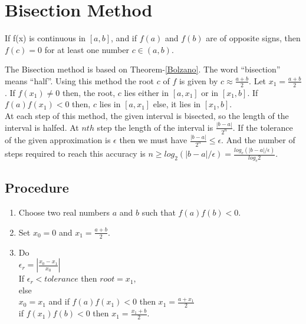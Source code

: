 \documentclass[aima203_lecturenotes_ku.tex]{subfiles}
\begin{document}
\section{Bisection Method}
\begin{mdframed}[style=myframe]
  \begin{theorem}
    \label{Bolzano}
  If f(x) is continuous in \([a,b]\), and if \(f(a)\) and \(f(b)\) are of opposite signs, then \(f(c)=0\) for at least one number \(c \in (a,b)\).
\end{theorem}
\end{mdframed}
The Bisection method is based on Theorem-\ref{Bolzano}. The word ``bisection'' means ``half''. Using this method the root \(c\) of \(f\) is given by \(\displaystyle c \approx \frac{a+b}{2}\). Let \(\displaystyle x_1=\frac{a+b}{2}\). If \(f(x_1) \neq 0\) then, the root, \(c\) lies either in \([a,x_1]\) or in \([x_1,b]\). If \(f(a)f(x_1) <0\) then, \(c\) lies in \([a,x_1]\) else, it lies in \([x_1,b]\). \\[4mm]
At each step of this method, the given interval is bisected, so the length of the interval is halfed. At \(nth\) step the length of the interval is \(\displaystyle \frac{|b-a|}{2^n}\). If the tolerance of the given approximation is \(\epsilon\) then we must have \(\displaystyle \frac{|b-a|}{2^n} \leq \epsilon\). And the number of steps required to reach this accuracy is \(\displaystyle n \geq log_2(|b-a|/\epsilon) = \frac{log_e(|b-a|/\epsilon)}{log_e2}\).

\subsection{Procedure}
\begin{enumerate}
\item Choose two real numbers \(a\) and \(b\) such that \(f(a)f(b) < 0\).
\item Set \(\displaystyle x_0 = 0\) and \(\displaystyle x_1= \frac{a+b}{2}\).
\item Do \\
  \(\displaystyle \epsilon_r = \left | \frac{x_0 -x_1}{x_0} \right |\) \\[1mm]
  If \(\epsilon_r < tolerance\) then \(root = x_1\), \\
  else\\
  \(x_0=x_1\) and if \(f(a)f(x_1) < 0\) then \(\displaystyle x_1= \frac{a+x_1}{2}\) \\
  if \(f(x_1)f(b) < 0\) then \(\displaystyle x_1= \frac{x_1+b}{2}\).
\end{enumerate}
\end{document}
